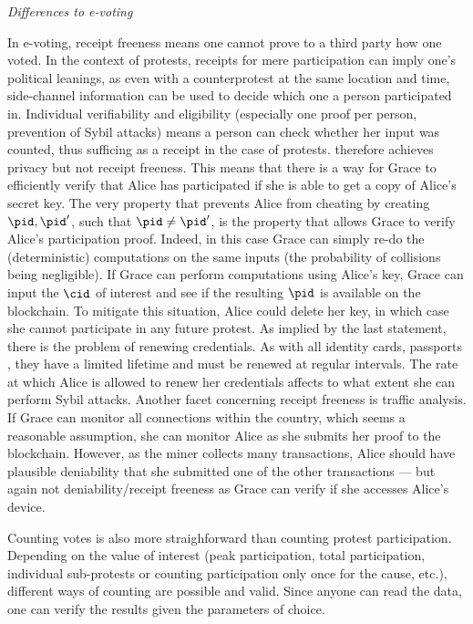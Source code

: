  
\emph{Differences to e-voting}

In e-voting, receipt freeness means one cannot prove to a third party
how one voted. In the context of protests, receipts for mere
participation can imply one's political leanings, as even with a
counterprotest at the same location and time, side-channel information
can be used to decide which one a person participated in. Individual
verifiability and eligibility (especially one proof per person,
prevention of Sybil attacks) means a person can check whether her
input was counted, thus sufficing as a receipt in the case of
protests.  \PRIVO therefore achieves privacy but not receipt freeness.
This means that there is a way for Grace to efficiently verify that
Alice has participated if she is able to get a copy of Alice's secret
key. The very property that prevents Alice from cheating by creating
\(\pid, \pid'\), such that \(\pid \neq \pid'\), is the property that
allows Grace to verify Alice's participation proof.  Indeed, in this
case Grace can simply re-do the (deterministic) computations on the
same inputs (the probability of collisions being negligible).  If
Grace can perform computations using Alice's key, Grace can input the
\(\cid\) of interest and see if the resulting \(\pid\) is available on
the blockchain.  To mitigate this situation, Alice could delete her
key, in which case she cannot participate in any future protest.  As
implied by the last statement, there is the problem of renewing
credentials.  As with all identity cards, passports \etc, they have a
limited lifetime and must be renewed at regular intervals.  The rate
at which Alice is allowed to renew her credentials affects to what
extent she can perform Sybil attacks. Another facet concerning receipt
freeness is traffic analysis. If Grace can monitor all connections
within the country, which seems a reasonable assumption, she can
monitor Alice as she submits her proof to the blockchain. However, as
the miner collects many transactions, Alice should have plausible
deniability that she submitted one of the other transactions --- but
again not deniability/receipt freeness as Grace can verify if she
accesses Alice's device.

Counting votes is also more straighforward than counting protest
participation. Depending on the value of interest (peak participation,
total participation, individual sub-protests or counting participation
only once for the cause, etc.), different ways of counting are
possible and valid. Since anyone can read the data, one can verify the
results given the parameters of choice.

